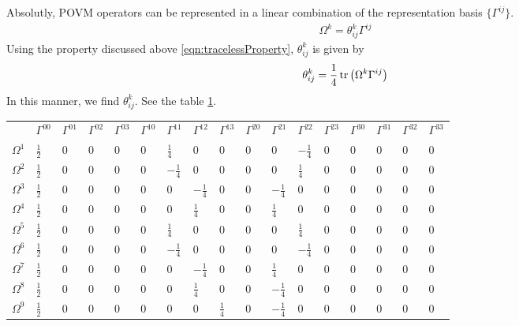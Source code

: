 Absolutly, POVM operators can be represented in a linear combination of the representation basis $\{\Gamma^{ij}\}$.
\begin{align}
    \Omega^{k} = \theta_{ij}^{k} \Gamma^{ij}
\end{align}
Using the property discussed above \ref{eqn:tracelessProperty}, $\theta_{ij}^{k}$ is given by
\begin{align}
    \theta_{ij}^{k} = \frac{1}{4} \trace{\left(\Omega^{k} \Gamma^{ij}\right)}
\end{align}
In this manner, we find $\theta_{ij}^{k}$. See the table \ref{table:theta}.
\begin{tiny}
    \begin{table}[]
        \label{table:theta}
        \begin{tabular}{lllllllllllllllll}
                         & $\Gamma^{00}$	&	$\Gamma^{01}$	&	$\Gamma^{02}$	&	$\Gamma^{03}$	&	$\Gamma^{10}$	&	$\Gamma^{11}$	&	$\Gamma^{12}$	&	$\Gamma^{13}$	&	$\Gamma^{20}$	&	$\Gamma^{21}$	&	$\Gamma^{22}$	&	$\Gamma^{23}$	&	$\Gamma^{30}$	&	$\Gamma^{31}$	&	$\Gamma^{32}$	&	$\Gamma^{33}$ \\ 
            $\Omega^{1}$ & $\frac{1}{2}$	&	0	&	0	&	0	&	0	&	$\frac{1}{4}$	&	0	&	0	&	0	&	0	&	$-\frac{1}{4}$	&	0	&	0	&	0	&	0	&	0 \\ 
            $\Omega^{2}$ & $\frac{1}{2}$	&	0	&	0	&	0	&	0	&	$-\frac{1}{4}$	&	0	&	0	&	0	&	0	&	$\frac{1}{4}$	&	0	&	0	&	0	&	0	&	0 \\ 
            $\Omega^{3}$ & $\frac{1}{2}$	&	0	&	0	&	0	&	0	&	0	&	$-\frac{1}{4}$	&	0	&	0	&	$-\frac{1}{4}$	&	0	&	0	&	0	&	0	&	0	&	0 \\ 
            $\Omega^{4}$ & $\frac{1}{2}$	&	0	&	0	&	0	&	0	&	0	&	$\frac{1}{4}$	&	0	&	0	&	$\frac{1}{4}$	&	0	&	0	&	0	&	0	&	0	&	0 \\ 
            $\Omega^{5}$ & $\frac{1}{2}$	&	0	&	0	&	0	&	0	&	$\frac{1}{4}$	&	0	&	0	&	0	&	0	&	$\frac{1}{4}$	&	0	&	0	&	0	&	0	&	0 \\ 
            $\Omega^{6}$ & $\frac{1}{2}$	&	0	&	0	&	0	&	0	&	$-\frac{1}{4}$	&	0	&	0	&	0	&	0	&	$-\frac{1}{4}$	&	0	&	0	&	0	&	0	&	0 \\ 
            $\Omega^{7}$ & $\frac{1}{2}$	&	0	&	0	&	0	&	0	&	0	&	$-\frac{1}{4}$	&	0	&	0	&	$\frac{1}{4}$	&	0	&	0	&	0	&	0	&	0	&	0 \\ 
            $\Omega^{8}$ & $\frac{1}{2}$	&	0	&	0	&	0	&	0	&	0	&	$\frac{1}{4}$	&	0	&	0	&	$-\frac{1}{4}$	&	0	&	0	&	0	&	0	&	0	&	0 \\ 
            $\Omega^{9}$ & $\frac{1}{2}$	&	0	&	0	&	0	&	0	&	0	&	0	&	$\frac{1}{4}$	&	0	&	$-\frac{1}{4}$	&	0	&	0	&	0	&	0	&	0	&	0 \\ 

\end{tabular}
\end{table}
\end{tiny}
